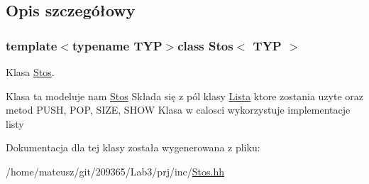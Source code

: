 \subsection{Opis szczegółowy}
\subsubsection*{template$<$typename T\-Y\-P$>$class Stos$<$ T\-Y\-P $>$}

Klasa \hyperlink{class_stos}{Stos}. 

Klasa ta modeluje nam \hyperlink{class_stos}{Stos} Składa się z pól klasy \hyperlink{class_lista}{Lista} ktore zostania uzyte oraz metod P\-U\-S\-H, P\-O\-P, S\-I\-Z\-E, S\-H\-O\-W Klasa w calosci wykorzystuje implementacje listy 

Dokumentacja dla tej klasy została wygenerowana z pliku\-:\begin{DoxyCompactItemize}
\item 
/home/mateusz/git/209365/\-Lab3/prj/inc/\hyperlink{_stos_8hh}{Stos.\-hh}\end{DoxyCompactItemize}
